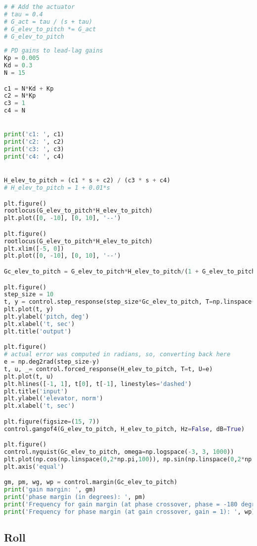 \begin{lstlisting}[language=Python]
# # Add the actuator 
# tau = 0.4
# G_act = tau / (s + tau)
# G_elev_to_pitch *= G_act
# G_elev_to_pitch
\end{lstlisting}

\begin{lstlisting}[language=Python]
# PD gains to lead-lag gains 
Kp = 0.005
Kd = 0.3
N = 15

c1 = N*Kd + Kp
c2 = N*Kp
c3 = 1
c4 = N


print('c1: ', c1)
print('c2: ', c2)
print('c3: ', c3)
print('c4: ', c4)


H_elev_to_pitch = (c1 * s + c2) / (c3 * s + c4)
# H_elev_to_pitch = 1 + 0.01*s

plt.figure()
rootlocus(G_elev_to_pitch*H_elev_to_pitch)
plt.plot([0, -10], [0, 10], '--')

plt.figure()
rootlocus(G_elev_to_pitch*H_elev_to_pitch)
plt.xlim([-5, 0])
plt.plot([0, -10], [0, 10], '--')

Gc_elev_to_pitch = G_elev_to_pitch*H_elev_to_pitch/(1 + G_elev_to_pitch*H_elev_to_pitch)

plt.figure()
step_size = 10
t, y = control.step_response(step_size*Gc_elev_to_pitch, T=np.linspace(0, 30, 1000))
plt.plot(t, y)
plt.ylabel('pitch, deg')
plt.xlabel('t, sec')
plt.title('output')

plt.figure()
# actual error was computed in radians, so, converting back here
e = np.deg2rad(step_size-y)
t, u, _= control.forced_response(H_elev_to_pitch, T=t, U=e)
plt.plot(t, u)
plt.hlines([-1, 1], t[0], t[-1], linestyles='dashed')
plt.title('input')
plt.ylabel('elevator, norm')
plt.xlabel('t, sec')

plt.figure(figsize=(15, 7))
control.gangof4(G_elev_to_pitch, H_elev_to_pitch, Hz=False, dB=True)

plt.figure()
control.nyquist(Gc_elev_to_pitch, omega=np.logspace(-3, 3, 1000))
plt.plot(np.cos(np.linspace(0,2*np.pi,100)), np.sin(np.linspace(0,2*np.pi,100)), '--')
plt.axis('equal')

gm, pm, wg, wp = control.margin(Gc_elev_to_pitch)
print('gain margin: ', gm)
print('phase margin (in degrees): ', pm)
print('Frequency for gain margin (at phase crossover, phase = -180 degrees): ', wg)
print('Frequency for phase margin (at gain crossover, gain = 1): ', wp)
\end{lstlisting}

\hypertarget{roll}{%
\subsection{Roll}\label{roll}}


